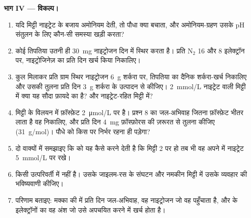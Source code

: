\begin{problem}
\medskip
\noindent\textbf{भाग IV --- विकल्प।}
\begin{enumerate}[resume]
  \item यदि मिट्टी नाइट्रेट के बजाय अमोनियम देती, तो पौधा क्या बचाता,
        और अमोनियम-ग्रहण उसके pH संतुलन के लिए कौन-सी समस्या खड़ी
        करता?
  \item कोई तिपतिया उतनी ही \qty{30}{mg} नाइट्रोजन दिन में स्थिर करता
        है। प्रति $\mathrm{N_2}$ \qty{16}{}  और \qty{8}{} इलेक्ट्रॉन
        पर, नाइट्रोजिनेज़ का प्रति दिन खर्च किया  निकालिए।
  \item कुल मिलाकर प्रति ग्राम स्थिर नाइट्रोजन \qty{6}{g} शर्करा पर,
        तिपतिया का दैनिक शर्करा-खर्च निकालिए और उसकी तुलना प्रति दिन
        \qty{3}{g} शर्करा के उत्पादन से कीजिए। \qty{2}{mmol/L}
        नाइट्रेट वाली मिट्टी में क्या यह सौदा फ़ायदे का है? और
        नाइट्रेट-रहित मिट्टी में?
  \item मिट्टी के विलयन में फ़ॉस्फ़ेट \qty{2}{\micro mol/L} पर है।
        प्रश्न 8 का जल-अभिवाह जितना फ़ॉस्फ़ेट भीतर लाता है वह
        निकालिए, और प्रति दिन \qty{4}{mg} फ़ॉस्फ़ोरस की ज़रूरत से
        तुलना कीजिए (\qty{31}{g/mol})। पौधे को किस पर निर्भर रहना ही
        पड़ेगा?
  \item दो वाक्यों में समझाइए कि   को यह कैसे करने
        देती है कि मिट्टी \qty{2}{} पर हो तब भी वह अपने  में
        नाइट्रेट \qty{5}{mmol/L} पर रखे।
  \item किसी उत्परिवर्ती में  नहीं है। उसके जाइलम-रस के
        संघटन और नमकीन मिट्टी में उसके व्यवहार की भविष्यवाणी कीजिए।
  \item परिणाम बताइए: मक्का की  में प्रति दिन जल-अभिवाह, वह
        नाइट्रोजन जो वह पहुँचाता है, और  के इलेक्ट्रॉनों का वह अंश
        जो उसे अपचयित करने में खर्च होता है।
\end{enumerate}
\end{problem}
